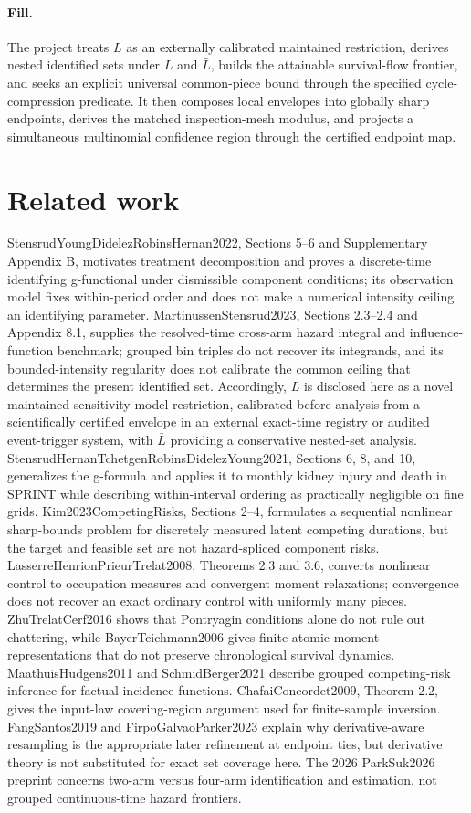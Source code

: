 \documentclass{article}
\begin{document}
\paragraph{Fill.} The project treats \(L\) as an externally calibrated maintained restriction, derives nested identified sets under \(L\) and \(\bar L\), builds the attainable survival-flow frontier, and seeks an explicit universal common-piece bound through the specified cycle-compression predicate. It then composes local envelopes into globally sharp endpoints, derives the matched inspection-mesh modulus, and projects a simultaneous multinomial confidence region through the certified endpoint map.

\section{Related work}

StensrudYoungDidelezRobinsHernan2022, Sections 5--6 and Supplementary Appendix B, motivates treatment decomposition and proves a discrete-time identifying g-functional under dismissible component conditions; its observation model fixes within-period order and does not make a numerical intensity ceiling an identifying parameter. MartinussenStensrud2023, Sections 2.3--2.4 and Appendix 8.1, supplies the resolved-time cross-arm hazard integral and influence-function benchmark; grouped bin triples do not recover its integrands, and its bounded-intensity regularity does not calibrate the common ceiling that determines the present identified set. Accordingly, \(L\) is disclosed here as a novel maintained sensitivity-model restriction, calibrated before analysis from a scientifically certified envelope in an external exact-time registry or audited event-trigger system, with \(\bar L\) providing a conservative nested-set analysis. StensrudHernanTchetgenRobinsDidelezYoung2021, Sections 6, 8, and 10, generalizes the g-formula and applies it to monthly kidney injury and death in SPRINT while describing within-interval ordering as practically negligible on fine grids. Kim2023CompetingRisks, Sections 2--4, formulates a sequential nonlinear sharp-bounds problem for discretely measured latent competing durations, but the target and feasible set are not hazard-spliced component risks. LasserreHenrionPrieurTrelat2008, Theorems 2.3 and 3.6, converts nonlinear control to occupation measures and convergent moment relaxations; convergence does not recover an exact ordinary control with uniformly many pieces. ZhuTrelatCerf2016 shows that Pontryagin conditions alone do not rule out chattering, while BayerTeichmann2006 gives finite atomic moment representations that do not preserve chronological survival dynamics. MaathuisHudgens2011 and SchmidBerger2021 describe grouped competing-risk inference for factual incidence functions. ChafaiConcordet2009, Theorem 2.2, gives the input-law covering-region argument used for finite-sample inversion. FangSantos2019 and FirpoGalvaoParker2023 explain why derivative-aware resampling is the appropriate later refinement at endpoint ties, but derivative theory is not substituted for exact set coverage here. The 2026 ParkSuk2026 preprint concerns two-arm versus four-arm identification and estimation, not grouped continuous-time hazard frontiers.
\end{document}
